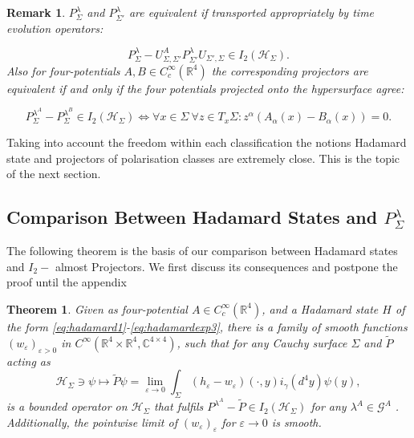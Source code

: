\documentclass[b5paper,draft,openbib,12pt]{memoir}
\newtheorem{Thm}[Def]{Theorem}
\newtheorem{Remark}[Def]{Remark}
\begin{document}
\begin{Remark}\label{main results of ivp2}
\(P_{\Sigma}^\lambda\) and \( P_{\Sigma'}^\lambda\) are equivalent if transported appropriately by time evolution operators\cite[theorem 2.8]{ivp2}:

\begin{equation}
P_{\Sigma}^\lambda-U_{\Sigma,\Sigma'}^A P_{\Sigma'}^\lambda U_{\Sigma',\Sigma}\in I_2(\mathcal{H}_\Sigma).
\end{equation}
Also for four-potentials \(A,B\in C_c^\infty(\mathbb{R}^4)\) 
the corresponding projectors are equivalent if and only if the four potentials projected onto the hypersurface agree\cite[theorem 1.5]{ivp2}:

\begin{equation}\label{equiv:pLambda}
P_{\Sigma}^{\lambda^A} - P_{\Sigma}^{\lambda^B} \in I_2(\mathcal{H}_\Sigma) \iff \forall x\in \Sigma~ \forall z\in T_x \Sigma: z^\alpha(A_\alpha(x)-B_\alpha(x))=0.
\end{equation}
\end{Remark}



Taking into account the freedom within each classification the notions Hadamard state and  projectors of polarisation classes are extremely close. 
This is the topic of the next section.


\subsection{Comparison Between Hadamard States and \(P^\lambda_\Sigma\)}\label{sec:comparison hadamard pol}

The following theorem is the basis of our comparison between Hadamard states and \(I_2-\) almost Projectors. We first
discuss its consequences and postpone the proof until the appendix 


\begin{Thm}\label{thm:hadamard=>Pol}
Given as four-potential \(A\in C_c^\infty (\mathbb{R}^4)\), and a Hadamard state \(H\) of the form 
\eqref{eq:hadamard1}-\eqref{eq:hadamardexp3}, there is a family of smooth functions 
\((w_\varepsilon)_{\varepsilon>0}\) in \( C^\infty(\mathbb{R}^4\times \mathbb{R}^4,\mathbb{C}^{4\times 4})\), such that for any Cauchy surface 
\(\Sigma\) and \(\tilde{P}\) acting as
\begin{equation}
\mathcal{H}_{\Sigma} \ni \psi \mapsto \tilde{P}\psi= \lim_{\varepsilon \rightarrow 0} \int_{\Sigma} (h_\varepsilon - w_\varepsilon)(\cdot,y)i_{\gamma}(d^4y) \psi(y),
\end{equation}
is a bounded operator on \(\mathcal{H}_\Sigma\) that fulfils \(P^{\lambda^A}-\tilde{P}\in I_2(\mathcal{H}_\Sigma)\) for any \(\lambda^A\in \mathcal{G}^A\) . 
Additionally, the pointwise limit of \((w_\varepsilon)_{\varepsilon}\) for \(\varepsilon \rightarrow 0\) is smooth.
\end{Thm}
\end{document}
